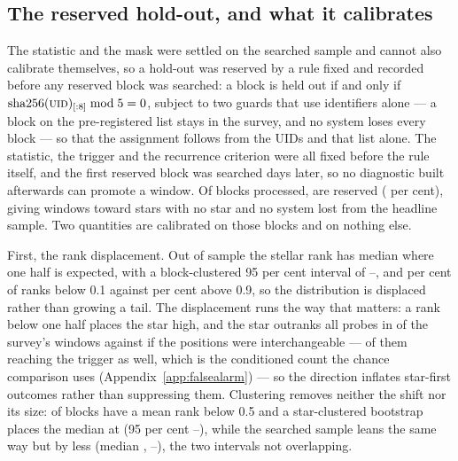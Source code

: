 \subsection{The reserved hold-out, and what it calibrates}
\label{sec:heldout}

The statistic and the mask were settled on the searched sample and cannot also
calibrate themselves, so a hold-out was reserved by a rule fixed and recorded
before any reserved block was searched: a block is held out if and only if
$\mathrm{sha256}(\textsc{uid})_{[:8]} \bmod 5 = 0$, subject to two guards that
use identifiers alone --- a block on the pre-registered list stays in the
survey, and no system loses every block --- so that the assignment follows
from the UIDs and that list alone. The statistic, the trigger and the
recurrence criterion were all fixed before the rule itself, and the first
reserved block was searched \HoLeadBlockDays{} days later, so no diagnostic
built afterwards can promote a window. Of \NEbProcessedAll{} blocks
processed, \NEbHeldOut{} are reserved (\HoPctHeld{} per cent), giving
\HoWin{} windows toward \HoStars{} stars with no star and no system lost
from the headline sample. Two quantities are calibrated on those blocks and
on nothing else.

First, the rank displacement. Out of sample the stellar rank has median
\HoRankMed{} where one half is expected, with a block-clustered 95 per cent
interval of \HoRankMedLo--\HoRankMedHi, and \HOFracLoPct{} per cent of ranks
below 0.1 against \HOFracHiPct{} per cent above 0.9, so the distribution is
displaced rather than growing a tail. The displacement runs the way that
matters: a rank below one half places the star high, and the star outranks
all \NCtrl{} probes in \NsrFirstObs{} of the survey's windows against
\NsrFirstExp{} if the positions were interchangeable --- \NStageOneFine{} of
them reaching the trigger as well, which is the conditioned count the chance
comparison uses (Appendix~\ref{app:falsealarm}) --- so the direction
inflates star-first outcomes rather than suppressing them.
Clustering removes neither the shift nor its size: \HOBlockBelow{} of
\HOBlockN{} blocks have a mean rank below 0.5 and a star-clustered bootstrap
places the median at \HOBootMed{} (95 per cent \HOBootLo--\HOBootHi), while
the searched sample leans the same way but by less (median \SurvMedP,
\SurvBootLo--\SurvBootHi), the two intervals not overlapping.

